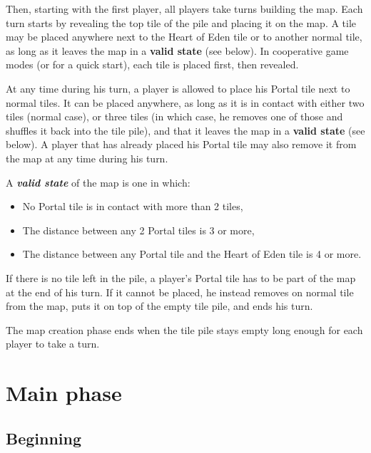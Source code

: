 \documentclass[a4paper]{article}
\begin{document}
    Then, starting with the first player, all players take turns building the map.
    Each turn starts by revealing the top tile of the pile and placing it on the map.
    A tile may be placed anywhere next to the Heart of Eden tile or to another normal tile, as long as it leaves the map in a \textbf{valid state} (see below).
    In cooperative game modes (or for a quick start), each tile is placed first, then revealed.
    
    At any time during his turn, a player is allowed to place his Portal tile next to normal tiles.
    It can be placed anywhere, as long as it is in contact with either two tiles (normal case),
    or three tiles (in which case, he removes one of those and shuffles it back into the tile pile),
    and that it leaves the map in a \textbf{valid state} (see below).
    A player that has already placed his Portal tile may also remove it from the map at any time during his turn.    
    
    A \textbf{\textit{valid state}} of the map is one in which:
    \vspace{-1.3em}
    \begin{itemize}
        \item No Portal tile is in contact with more than 2 tiles,
        \item The distance between any 2 Portal tiles is 3 or more,
        \item The distance between any Portal tile and the Heart of Eden tile is 4 or more.
    \end{itemize}
    
    \vspace{-0.7em}
    If there is no tile left in the pile, a player's Portal tile has to be part of the map at the end of his turn.
    If it cannot be placed, he instead removes on normal tile from the map, puts it on top of the
    empty tile pile, and ends his turn.
    
    The map creation phase ends when the tile pile stays empty long enough for each player to take a turn.


\newpage
\section{Main phase}

  \subsection{Beginning}
  
\end{document}
